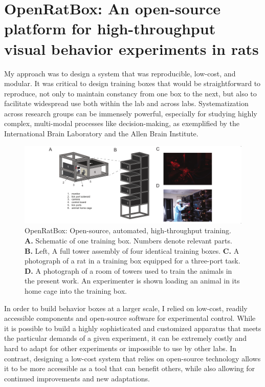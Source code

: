 \section{OpenRatBox: An open-source platform for high-throughput visual behavior experiments in rats}
My approach was to design a system that was reproducible, low-cost, and modular. It was critical to design training boxes that would be straightforward to reproduce, not only to maintain constancy from one box to the next, but also to facilitate widespread use both within the lab and across labs. Systematization across research groups can be immensely powerful, especially for studying highly complex, multi-modal processes like decision-making, as exemplified by the International Brain Laboratory and the Allen Brain Institute.

\begin{figure}[t!]
    \includegraphics[width=\textwidth]{figures/chapter_1/fig_1-1_openratbox/fig_1-1_openratbox_compressed.pdf}
    \vspace{.1in}
    \caption[OpenRatBox]{OpenRatBox: Open-source, automated, high-throughput training. \textbf{A.} Schematic of one training box. Numbers denote relevant parts. 
    \textbf{B.} Left, A full tower assembly of four identical training boxes. \textbf{C.} A photograph of a rat in a training box equipped for a three-port task. \textbf{D.} A photograph of a room of towers used to train the animals in the present work. An experimenter is shown loading an animal in its home cage into the training box.  
    \label{fig:openratbox}}
\end{figure}

In order to build behavior boxes at a larger scale, I relied on low-cost, readily accessible components and open-source software for experimental control. While it is possible to build a highly sophisticated and customized apparatus that meets the particular demands of a given experiment, it can be extremely costly and hard to adapt for other experiments or impossible to use by other labs. In contrast, designing a low-cost system that relies on open-source technology allows it to be more accessible as a tool that can benefit others, while also allowing for continued improvements and new adaptations. 

